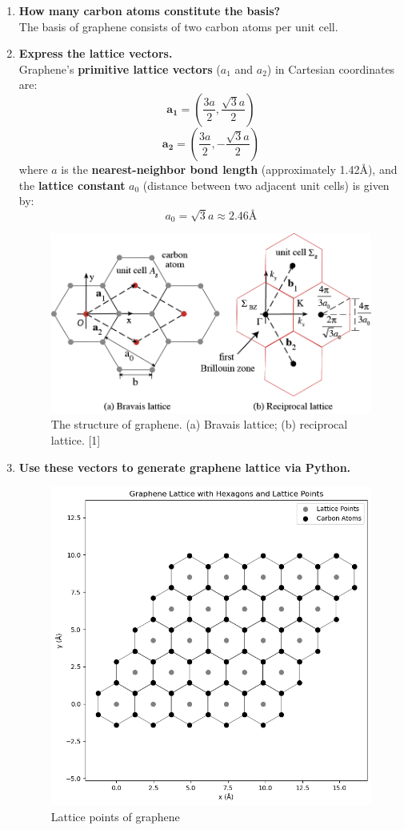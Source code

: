 \documentclass[12pt,a4paper]{article}
\begin{document}
\begin{CJK}{UTF8}{bkai}
\begin{enumerate}
    \item \textbf{How many carbon atoms constitute the basis?}\\
    The basis of graphene consists of two carbon atoms per unit cell.
    \item \textbf{Express the lattice vectors.}\\
    Graphene's \textbf{primitive lattice vectors} ($a_1$ and $a_2$) in Cartesian coordinates are:
    \begin{equation}
        \mathbf{a_{1}}=\left( \frac{3a}{2}, \frac{\sqrt{3}a}{2}\right)
    \end{equation}
    \begin{equation}
        \mathbf{a_{2}}=\left( \frac{3a}{2}, -\frac{\sqrt{3}a}{2}\right)
    \end{equation}
    where $a$ is the \textbf{nearest-neighbor bond length} (approximately 1.42\AA), and the \textbf{lattice constant} $a_0$ (distance between two adjacent unit cells) is given by:
    \begin{equation}
        a_{0} = \sqrt{3}a \approx 2.46 \textit{\AA}
    \end{equation}
    \begin{figure}[h]
        \centering
        \includegraphics[width=0.5\linewidth]{figures/graphene_lattice.png}
        \caption{The structure of graphene. (a) Bravais lattice; (b) reciprocal lattice. [1]}
        \label{fig:graphene_lattice_cartoon}
    \end{figure}
    \clearpage
    \item \textbf{Use these vectors to generate graphene lattice via Python.}
    \begin{figure}[h]
        \centering
        \includegraphics[width=0.6\linewidth]{figures/graphene.png}
        \caption{Lattice points of graphene}
        \label{fig:graphene_lattice}
    \end{figure}    
\end{enumerate}


\end{CJK}
\end{document}

